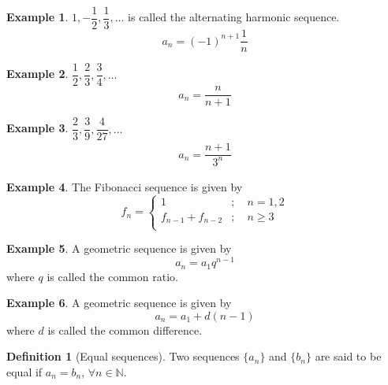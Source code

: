 \documentclass[fleqn, a4paper, 12pt, twoside]{article}
\theoremstyle{definition}
\newtheorem{example}{Example}
\newtheorem{definition}{Definition}
\theoremstyle{theorem}
\begin{document}
{\begin{example}
	$1, -\dfrac{1}{2}, \dfrac{1}{3}, \dots$ is called the alternating harmonic sequence.
	\begin{equation*}
		a_n = (-1)^{n + 1} \dfrac{1}{n}
	\end{equation*}
\end{example}

\begin{example}
	$\dfrac{1}{2}, \dfrac{2}{3}, \dfrac{3}{4}, \dots$
	\begin{equation*}
		a_n = \dfrac{n}{n + 1}
	\end{equation*}
\end{example}

\begin{example}
	$\dfrac{2}{3}, \dfrac{3}{9}, \dfrac{4}{27}, \dots$
	\begin{align*}
		a_n = \dfrac{n + 1}{3^n}
	\end{align*}
\end{example}

\begin{example}
	The Fibonacci sequence is given by
	\begin{equation*}
		f_n =
			\begin{cases}
				1 &;\quad n = 1, 2\\
				f_{n - 1} + f_{n - 2} &;\quad n \geq 3\\
			\end{cases}
	\end{equation*}
\end{example}

\begin{example}
	A geometric sequence is given by
	\begin{equation*}
		a_n = a_1 q^{n - 1}
	\end{equation*}
	where $q$ is called the common ratio.
\end{example}

\begin{example}
	A geometric sequence is given by
	\begin{equation*}
		a_n = a_1 + d(n - 1)
	\end{equation*}
	where $d$ is called the common difference.
\end{example}

\begin{definition}[Equal sequences]
	Two sequences $\{a_n\}$ and $\{b_n\}$ are said to be equal if $a_n = b_n$, $\forall n \in \mathbb{N}$.
\end{definition}

}
\end{document}
